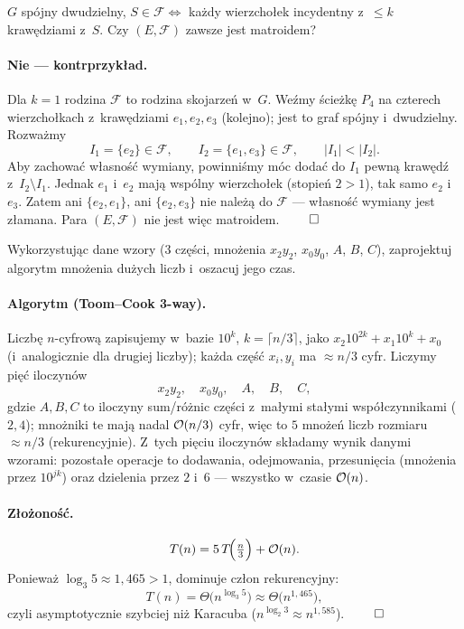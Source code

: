 \clearpage
\begin{zadanie}
	$G$ spójny dwudzielny, $S\in\mathcal{F}\iff$ każdy wierzchołek incydentny
	z~$\le k$ krawędziami z~$S$. Czy $(E,\mathcal{F})$ zawsze jest matroidem?
\end{zadanie}

\paragraph{Nie --- kontrprzykład.}
Dla $k=1$ rodzina $\mathcal{F}$ to rodzina skojarzeń w~$G$. Weźmy ścieżkę
$P_4$ na czterech wierzchołkach z~krawędziami $e_1,e_2,e_3$ (kolejno);
jest to graf spójny i~dwudzielny. Rozważmy
\[
	I_1=\{e_2\}\in\mathcal{F},\qquad I_2=\{e_1,e_3\}\in\mathcal{F},
	\qquad |I_1|<|I_2|.
\]
Aby zachować własność wymiany, powinniśmy móc dodać do $I_1$ pewną krawędź
z~$I_2\setminus I_1$. Jednak $e_1$ i~$e_2$ mają wspólny wierzchołek (stopień $2>1$),
tak samo $e_2$ i~$e_3$. Zatem ani $\{e_2,e_1\}$, ani $\{e_2,e_3\}$ nie należą do
$\mathcal{F}$ --- własność wymiany jest złamana. Para $(E,\mathcal{F})$ nie jest
więc matroidem. $\qed$

\clearpage
\begin{zadanie}
	Wykorzystując dane wzory (3 części, mnożenia $x_2y_2$, $x_0y_0$, $A$, $B$, $C$),
	zaprojektuj algorytm mnożenia dużych liczb i~oszacuj jego czas.
\end{zadanie}

\paragraph{Algorytm (Toom--Cook 3-way).}
Liczbę $n$-cyfrową zapisujemy w~bazie $10^{k}$, $k=\lceil n/3\rceil$, jako
$x_2 10^{2k}+x_1 10^{k}+x_0$ (i~analogicznie dla drugiej liczby); każda część
$x_i,y_i$ ma $\approx n/3$ cyfr. Liczymy pięć iloczynów
\[
	x_2y_2,\quad x_0y_0,\quad A,\quad B,\quad C,
\]
gdzie $A,B,C$ to iloczyny sum/różnic części z~małymi stałymi współczynnikami
($2,4$); mnożniki te mają nadal $\mathcal{O}(n/3)$ cyfr, więc to $5$ mnożeń liczb
rozmiaru $\approx n/3$ (rekurencyjnie). Z~tych pięciu iloczynów składamy wynik
danymi wzorami: pozostałe operacje to dodawania, odejmowania, przesunięcia
(mnożenia przez $10^{jk}$) oraz dzielenia przez  $2$ i~$6$ ---
wszystko w~czasie $\mathcal{O}(n)$.

\paragraph{Złożoność.}
\[
	T(n)=5\,T\!\Big(\tfrac n3\Big)+\mathcal{O}(n).
\]
Ponieważ $\log_3 5\approx 1{,}465>1$, dominuje człon rekurencyjny:
\[
	T(n)=\Theta\!\big(n^{\log_3 5}\big)\approx\Theta\!\big(n^{1{,}465}\big),
\]
czyli asymptotycznie szybciej niż Karacuba ($n^{\log_2 3}\approx n^{1{,}585}$).
$\qed$

